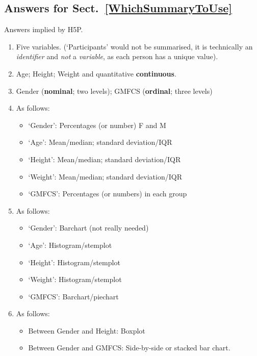 \documentclass[
  11pt,
  a4paper,
  krantz2]{krantz}
\providecommand{\tightlist}{%
  \setlength{\itemsep}{0pt}\setlength{\parskip}{0pt}}
\begin{document}
\begin{footnotesize}
\subsection*{Answers for Sect.~\ref{WhichSummaryToUse}}\label{answers-for-sect.-refwhichsummarytouse}

Answers implied by H5P.

\begin{enumerate}
\def\labelenumi{\arabic{enumi}.}
\tightlist
\item
  Five variables. (`Participants' would not be summarised, it is technically an \emph{identifier} and \emph{not} a \emph{variable}, as each person has a unique value).
\item
  Age; Height; Weight and quantitative \textbf{continuous}.
\item
  Gender (\textbf{nominal}; two levels); GMFCS (\textbf{ordinal}; three levels)
\item
  As follows:

  \begin{itemize}
  \tightlist
  \item
    `Gender': Percentages (or number) F and M
  \item
    `Age': Mean/median; standard deviation/IQR
  \item
    `Height': Mean/median; standard deviation/IQR
  \item
    `Weight': Mean/median; standard deviation/IQR
  \item
    `GMFCS': Percentages (or numbers) in each group
  \end{itemize}
\item
  As follows:

  \begin{itemize}
  \tightlist
  \item
    `Gender': Barchart (not really needed)
  \item
    `Age': Histogram/stemplot
  \item
    `Height': Histogram/stemplot
  \item
    `Weight': Histogram/stemplot
  \item
    `GMFCS': Barchart/piechart
  \end{itemize}
\item
  As follows:

  \begin{itemize}
  \tightlist
  \item
    Between Gender and Height: Boxplot
  \item
    Between Gender and GMFCS: Side-by-side or stacked bar chart.
  \end{itemize}
\end{enumerate}


\end{footnotesize}
\end{document}
